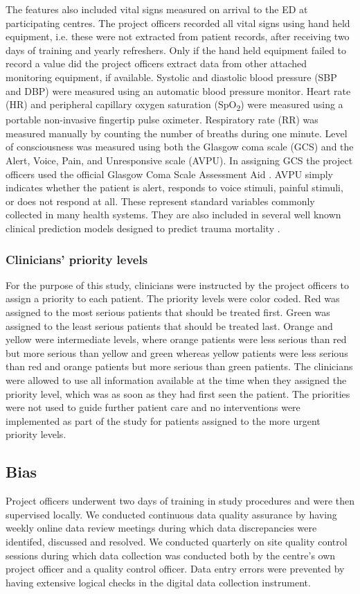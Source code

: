 \documentclass[10pt,letterpaper]{article}\usepackage[]{graphicx}\usepackage[]{color}
\begin{document}
The features also included vital signs measured on arrival to the ED at
participating centres. The project officers recorded all vital signs using hand
held equipment, i.e. these were not extracted from patient records, after
receiving two days of training and yearly refreshers. Only if the hand held
equipment failed to record a value did the project officers extract data from
other attached monitoring equipment, if available. Systolic and diastolic blood
pressure (SBP and DBP) were measured using an automatic blood pressure
monitor. Heart rate (HR) and peripheral capillary oxygen saturation
(SpO\textsubscript{2}) were measured using a portable non-invasive fingertip
pulse oximeter. Respiratory rate (RR) was measured manually by counting the
number of breaths during one minute. Level of consciousness was measured using
both the Glasgow coma scale (GCS) and the Alert, Voice, Pain, and Unresponsive
scale (AVPU). In assigning GCS the project officers used the official Glasgow
Coma Scale Assessment Aid \cite{GCSAID}. AVPU simply indicates whether the
patient is alert, responds to voice stimuli, painful stimuli, or does not
respond at all. These represent standard variables commonly collected in many
health systems. They are also included in several well known clinical prediction
models designed to predict trauma mortality \cite{Rehn2011}.

\subsubsection*{Clinicians' priority levels}
For the purpose of this study, clinicians were instructed by the project
officers to assign a priority to each patient. The priority levels were color
coded. Red was assigned to the most serious patients that should be treated
first. Green was assigned to the least serious patients that should be treated
last. Orange and yellow were intermediate levels, where orange patients were
less serious than red but more serious than yellow and green whereas yellow
patients were less serious than red and orange patients but more serious than
green patients. The clinicians were allowed to use all information available at
the time when they assigned the priority level, which was as soon as they had first
seen the patient. The priorities were not used to guide further patient care and
no interventions were implemented as part of the study for patients assigned to
the more urgent priority levels.

\subsection*{Bias}
Project officers underwent two days of training in study procedures and were
then supervised locally. We conducted continuous data quality assurance by having
weekly online data review meetings during which data discrepancies were
identifed, discussed and resolved. We conducted quarterly on site quality
control sessions during which data collection was conducted both by the centre's
own project officer and a quality control officer. Data entry errors were
prevented by having extensive logical checks in the digital data collection
instrument.
\end{document}
